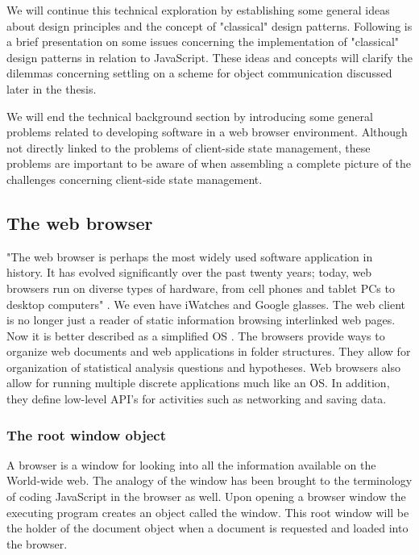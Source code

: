 \documentclass[english]{ifimaster}
\begin{document}
We will continue this technical exploration by establishing some general ideas about design principles and the concept of "classical" design patterns. Following is a brief presentation on some issues concerning the implementation of "classical" design patterns in relation to JavaScript. These ideas and concepts will clarify the dilemmas concerning settling on a scheme for object communication discussed later in the thesis.

We will end the technical background section by introducing some general problems related to developing software in a web browser environment. Although not directly linked to the problems of client-side state management, these problems are important to be aware of when assembling a complete picture of the challenges concerning client-side state management.

\subsection{The web browser}
\label{sec:webBrowser}
"The web browser is perhaps the most widely used software application in history. It has evolved significantly over the past twenty years; today, web browsers run on diverse types of hardware, from cell phones and tablet PCs to desktop computers" \parencite[p. 2]{gross}. We even have iWatches and Google glasses. The web client is no longer just a reader of static information browsing interlinked web pages. Now it is better described as a simplified OS \parencite[p.310]{flanagan}. The browsers provide ways to organize web documents and web applications in folder structures. They allow for organization of statistical analysis questions and hypotheses. Web browsers also allow for running multiple discrete applications much like an OS. In addition, they define low-level API's for activities such as networking and saving data. 

\subsubsection{The root window object}
A browser is a window for looking into all the information available on the World-wide web. The analogy of the window has been brought to the terminology of coding JavaScript in the browser as well. Upon opening a browser window the executing program creates an object called the window. This root window will be the holder of the document object when a document is requested and loaded into the browser. 
\end{document}
